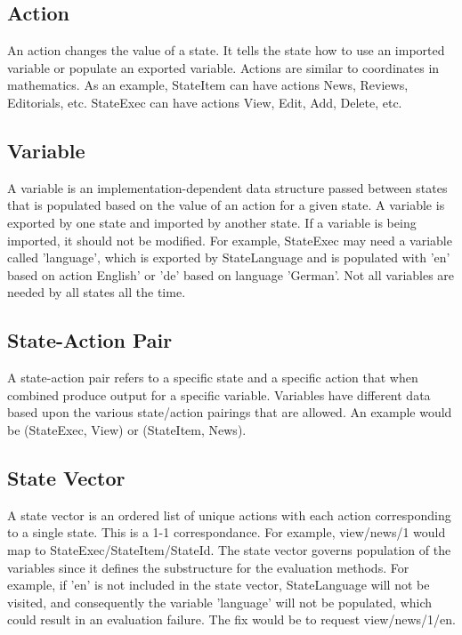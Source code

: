 \documentclass[11pt,twocolumn]{article}
\begin{document}
\subsection{Action}
An action changes the value of a state. It tells the state how to use an imported variable or populate an exported variable. Actions are similar to coordinates in mathematics. As an example, StateItem can have actions News, Reviews, Editorials, etc. StateExec can have actions View, Edit, Add, Delete, etc.

\subsection{Variable}
A variable is an implementation-dependent data structure passed between states that is populated based on the value of an action for a given state. A variable is exported by one state and imported by another state. If a variable is being imported, it should not be modified. For example, StateExec may need a variable called 'language', which is exported by StateLanguage and is populated with 'en' based on action English' or 'de' based on language 'German'. Not all variables are needed by all states all the time.

\subsection{State-Action Pair}
A state-action pair refers to a specific state and a specific action that when combined produce output for a specific variable. Variables have different data based upon the various state/action pairings that are allowed. An example would be (StateExec, View) or (StateItem, News).

\subsection{State Vector}
A state vector is an ordered list of unique actions with each action corresponding to a single state. This is a 1-1 correspondance. For example, view/news/1 would map to StateExec/StateItem/StateId. The state vector governs population of the variables since it defines the substructure for the evaluation methods. For example, if 'en' is not included in the state vector, StateLanguage will not be visited, and consequently the variable 'language' will not be populated, which could result in an evaluation failure. The fix would be to request view/news/1/en.
\end{document}
